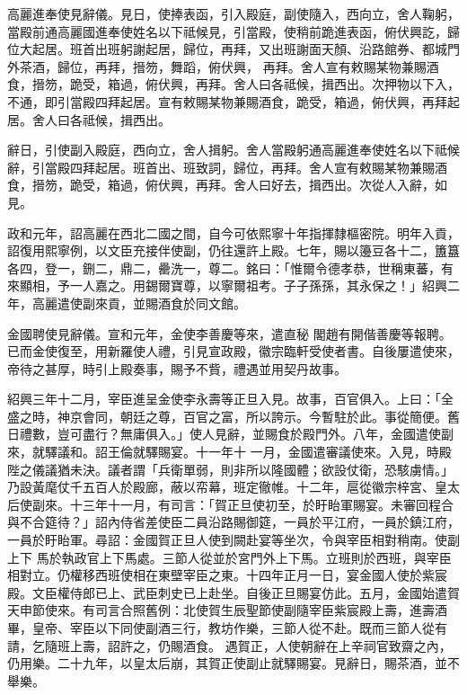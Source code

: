 \begin{pinyinscope}
 高麗進奉使見辭儀。見日，使捧表函，引入殿庭，副使隨入，西向立，舍人鞠躬，當殿前通高麗國進奉使姓名以下祗候見，引當殿，使稍前跪進表函，俯伏興訖，歸位大起居。班首出班躬謝起居，歸位，再拜，又出班謝面天顏、沿路館券、都城門外茶酒，歸位，再拜，搢笏，舞蹈，俯伏興，
 再拜。舍人宣有敕賜某物兼賜酒食，搢笏，跪受，箱過，俯伏興，再拜。舍人曰各祗候，揖西出。次押物以下入，不通，即引當殿四拜起居。宣有敕賜某物兼賜酒食，跪受，箱過，俯伏興，再拜起居。舍人曰各祗候，揖西出。



 辭日，引使副入殿庭，西向立，舍人揖躬。舍人當殿躬通高麗進奉使姓名以下祗候辭，引當殿四拜起居。班首出、班致詞，歸位，再拜。舍人宣有敕賜某物兼賜酒食，搢笏，跪受，箱過，俯伏興，再拜。舍人曰好去，揖西出。次從人入辭，如見。



 政和元年，詔高麗在西北二國之間，自今可依熙寧十年指揮隸樞密院。明年入貢，詔復用熙寧例，以文臣充接伴使副，仍往還許上殿。七年，賜以籩豆各十二，簠簋各四，登一，鉶二，鼎二，罍洗一，尊二。銘曰：「惟爾令德孝恭，世稱東蕃，有來顯相，予一人嘉之。用錫爾寶尊，以寧爾祖考。子子孫孫，其永保之！」紹興二年，高麗遣使副來貢，並賜酒食於同文館。



 金國聘使見辭儀。宣和元年，金使李善慶等來，遣直秘
 閣趙有開偕善慶等報聘。已而金使復至，用新羅使人禮，引見宣政殿，徽宗臨軒受使者書。自後屢遣使來，帝待之甚厚，時引上殿奏事，賜予不貲，禮遇並用契丹故事。



 紹興三年十二月，宰臣進呈金使李永壽等正旦入見。故事，百官俱入。上曰：「全盛之時，神京會同，朝廷之尊，百官之富，所以誇示。今暫駐於此。事從簡便。舊日禮數，豈可盡行？無庸俱入。」使人見辭，並賜食於殿門外。八年，金國遣使副來，就驛議和。詔王倫就驛賜宴。十一年十
 一月，金國遣審議使來。入見，時殿陛之儀議猶未決。議者謂「兵衛單弱，則非所以隆國體；欲設仗衛，恐駭虜情。」乃設黃麾仗千五百人於殿廊，蔽以帟幕，班定徹帷。十二年，扈從徽宗梓宮、皇太后使副來。十三年十一月，有司言：「賀正旦使初至，於盱眙軍賜宴。未審回程合與不合筵待？」詔內侍省差使臣二員沿路賜御筵，一員於平江府，一員於鎮江府，一員於盱眙軍。尋詔：金國賀正旦人使到闕赴宴等坐次，令與宰臣相對稍南。使副上下
 馬於執政官上下馬處。三節人從並於宮門外上下馬。立班則於西班，與宰臣相對立。仍權移西班使相在東壁宰臣之東。十四年正月一日，宴金國人使於紫宸殿。文臣權侍郎已上、武臣刺史已上赴坐。自後正旦賜宴仿此。五月，金國始遣賀天申節使來。有司言合照舊例：北使賀生辰聖節使副隨宰臣紫宸殿上壽，進壽酒畢，皇帝、宰臣以下同使副酒三行，教坊作樂，三節人從不赴。既而三節人從有請，乞隨班上壽，詔許之，仍賜酒食。
 遇賀正，人使朝辭在上辛祠官致齋之內，仍用樂。二十九年，以皇太后崩，其賀正使副止就驛賜宴。見辭日，賜茶酒，並不舉樂。




\end{pinyinscope}
